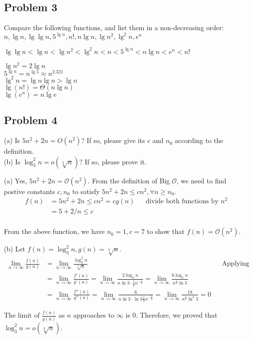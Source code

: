 \documentclass[a4paper]{article}
\makeatletter
\newenvironment{solution}
  {\begin{proof}[Solution]}
  {\end{proof}}
\renewenvironment{proof}[1][\proofname]{%
  \par\pushQED{\qed}\normalfont%
  \topsep6\p@\@plus6\p@\relax
  \trivlist\item[\hskip\labelsep\bfseries#1\@addpunct{.}]%
  \ignorespaces
}{%
  \popQED\endtrivlist\@endpefalse
}
\makeatother
\begin{document}
\subsection*{Problem 3}
Compare the following functions, and list them in a non-decreasing order: \\
$n, \lg n, \lg \lg n, 5^{\lg n}, n!, n \lg n, \lg n^2, \lg^2 n, e^n$
\begin{solution}
  $\lg\lg n < \lg n < \lg n^2 < \lg^2 n< n < 5^{\lg n} < n \lg n < e^n < n!$

 $\lg n^2 = 2\lg n$ \\
 $5^{\lg n} = n^{\lg 5} \approx n^{2.321}$ \\
 $\lg^2 n = \lg n \lg n > \lg n$ \\
 $\lg(n!) = \Theta(n \lg n)$ \\
 $\lg(e^n) = n \lg e$
\end{solution}

\subsection*{Problem 4}
(a) Is $5n^2+2n =O(n^2)$? If so, please give its $c$ and $n_0$ according to the definition. \\
(b) Is $\log_3^2 n =o(\sqrt[3]n)$? If so, please prove it.
\begin{solution}
  (a) Yes, $5n^2 + 2n = \mathcal{O}(n^2)$. From the definition of Big $\mathcal{O}$, we need to find postive constants $c, n_0$ to satisfy $5n^2 + 2n \le cn^2, \forall n \ge n_0$.
  \begin{align*}
    f(n) &= 5n^2 + 2n \le cn^ 2 = cg(n) && \text{divide both functions by $n^2$}\\
        &= 5 + 2/n \le c \\
  \end{align*}

  From the above function, we have $n_0 = 1, c = 7$ to show that $f(n) = \mathcal{O}(n^2)$.
\end{solution}

\begin{solution}
  (b) Let $f(n) = \log_3^2 n, g(n) = \sqrt[3]{n}$.
  \begin{align*}
    \lim\limits_{n \to \infty}\frac{f(n)}{g(n)} &= \lim\limits_{n \to \infty}\frac{\log_3^2 n}{\sqrt[3]n} && \text{Applying L'Hospital's Rule} \\
                                                &= \lim\limits_{n \to \infty}\frac{f'(n)}{g'(n)} =  \lim\limits_{n \to \infty}\frac{2\log_3 n}{n \ln 3 \cdot \frac{1}{3} n^{-\frac{2}{3}}} = \lim\limits_{n \to \infty}\frac{6 \log_3 n}{n^{\frac{1}{3}} \ln 3}\\
                                                &= \lim\limits_{n \to \infty}\frac{f''(n)}{g''(n)} =\lim\limits_{n \to \infty}\frac{6}{n \ln 3 \cdot \ln 3 \frac{1}{3} n^{-\frac{2}{3}}} = \lim\limits_{n \to \infty}\frac{18}{n^{\frac{1}{3}} \ln^2 3} = 0
  \end{align*}

  The limit of $\frac{f(n)}{g(n)}$ as $n$ approaches to $\infty$ is $0$. Therefore, we proved that $\log_3^2 n = o(\sqrt[3]{n})$.
\end{solution}
\end{document}
